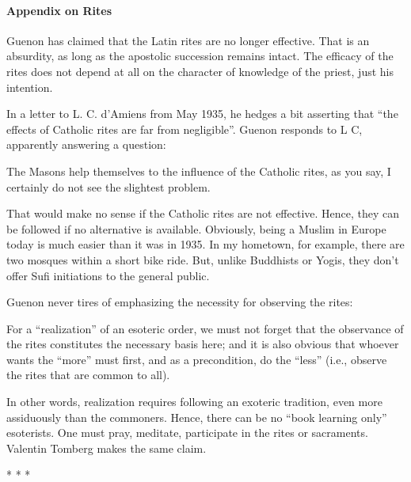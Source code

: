 \paragraph{Appendix on Rites}


Guenon has claimed that the Latin rites are no longer effective. That is an absurdity, as long as the apostolic succession remains intact. The efficacy of the rites does not depend at all on the character of knowledge of the priest, just his intention.

In a letter to L. C. d'Amiens from May 1935, he hedges a bit asserting that ``the effects of Catholic rites are far from negligible''. Guenon responds to L C, apparently answering a question:

\begin{quotex}
The Masons help themselves to the influence of the Catholic rites, as you say, I certainly do not see the slightest problem.
\end{quotex}


That would make no sense if the Catholic rites are not effective. Hence, they can be followed if no alternative is available. Obviously, being a Muslim in Europe today is much easier than it was in 1935. In my hometown, for example, there are two mosques within a short bike ride. But, unlike Buddhists or Yogis, they don't offer Sufi initiations to the general public.

Guenon never tires of emphasizing the necessity for observing the rites:

\begin{quotex}
For a ``realization'' of an esoteric order, we must not forget that the observance of the rites constitutes the necessary basis here; and it is also obvious that whoever wants the ``more'' must first, and as a precondition, do the ``less'' (i.e., observe the rites that are common to all).
\end{quotex}


In other words, realization requires following an exoteric tradition, even more assiduously than the commoners. Hence, there can be no ``book learning only'' esoterists. One must pray, meditate, participate in the rites or sacraments. Valentin Tomberg makes the same claim.



\begin{center}* * *\end{center}

